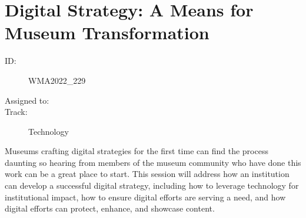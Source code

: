 \documentclass{report}
\begin{document}
              

              

              
        
          \newpage
          \section{ Digital Strategy: A Means for Museum Transformation }
            \begin{description}
              \item [ID:]
              WMA2022\_229

              \item [Assigned to:]
                \item [Track:]Technology~
              \end{description}

              Museums crafting digital strategies for the first time can find the process daunting so hearing from members of the museum community who have done this work can be a great place to start. This session will address how an institution can develop a successful digital strategy, including how to leverage technology for institutional impact, how to ensure digital efforts are serving a need, and how digital efforts can protect, enhance, and showcase content.
\end{document}
